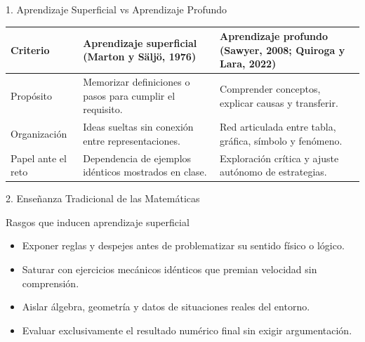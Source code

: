 \documentclass[aspectratio=169,spanish,xcolor=table]{beamer}
\begin{document}
\begin{frame}{1. Aprendizaje Superficial vs Aprendizaje Profundo}
  \scriptsize\renewcommand{\arraystretch}{1.4}
  \begin{tabular}{p{2.4cm}p{5.3cm}p{5.3cm}}
    \toprule
    \rowcolor{iiiepePale} \textbf{Criterio} & \textbf{Aprendizaje superficial (Marton y Säljö, 1976)} & \textbf{Aprendizaje profundo (Sawyer, 2008; Quiroga y Lara, 2022)} \\
    \midrule
    Propósito & Memorizar definiciones o pasos para cumplir el requisito. & Comprender conceptos, explicar causas y transferir. \\
    Organización & Ideas sueltas sin conexión entre representaciones. & Red articulada entre tabla, gráfica, símbolo y fenómeno. \\
    Papel ante el reto & Dependencia de ejemplos idénticos mostrados en clase. & Exploración crítica y ajuste autónomo de estrategias. \\
    \bottomrule
  \end{tabular}
\end{frame}

\begin{frame}{2. Enseñanza Tradicional de las Matemáticas}
  \begin{block}{Rasgos que inducen aprendizaje superficial}
    \begin{itemize}\small
      \item Exponer reglas y despejes antes de problematizar su sentido físico o lógico.
      \item Saturar con ejercicios mecánicos idénticos que premian velocidad sin comprensión.
      \item Aislar álgebra, geometría y datos de situaciones reales del entorno.
      \item Evaluar exclusivamente el resultado numérico final sin exigir argumentación.
    \end{itemize}
  \end{block}
\end{frame}
\end{document}
